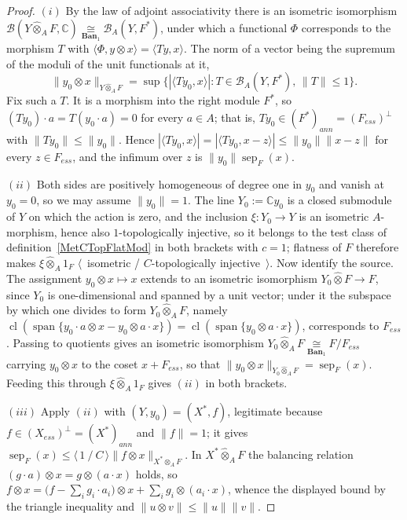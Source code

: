 \documentclass[11pt]{article}
\theoremstyle{plain}
\theoremstyle{definition}
\newcommand{\projtens}{\mathbin{\widehat{\otimes}}}
\newcommand{\projmodtens}[1]{\mathbin{\widehat{\otimes}}_{#1}}
\newcommand{\isom}[1]{\mathrel{\mathop{\cong}\limits_{#1}}}
\DeclareMathOperator{\sep}{sep}
\begin{document}
\begin{proof}
$(i)$ By the law of adjoint associativity there is an isometric isomorphism
$\mathcal{B}(Y\projmodtens{A}F,\mathbb{C})
\isom{\mathbf{Ban}_1}\mathcal{B}_A(Y,F^*)$, under which a functional $\Phi$
corresponds to the morphism $T$ with
$\langle\Phi,y\otimes x\rangle=\langle Ty,x\rangle$. The norm of a vector being
the supremum of the moduli of the unit functionals at it,
\[
\lVert y_0\otimes x\rVert_{Y\projmodtens{A}F}
=\sup \{|\langle Ty_0,x\rangle|:T\in\mathcal{B}_A(Y,F^*),\,\lVert T\rVert\leq 1 \}.
\]
Fix such a $T$. It is a morphism into the right module $F^*$, so
$(Ty_0)\cdot a=T(y_0\cdot a)=0$ for every $a\in A$; that is,
$Ty_0\in{(F^*)}_{ann}={(F_{ess})}^\perp$ with
$\lVert Ty_0\rVert\leq\lVert y_0\rVert$. Hence
$|\langle Ty_0,x\rangle|=|\langle Ty_0,x-z\rangle|\leq\lVert y_0\rVert
\lVert x-z\rVert$ for every $z\in F_{ess}$, and the infimum over $z$ is
$\lVert y_0\rVert\sep_F(x)$.

$(ii)$ Both sides are positively homogeneous of degree one in $y_0$ and vanish at
$y_0=0$, so we may assume $\lVert y_0\rVert=1$. The line $Y_0:=\mathbb{C}y_0$ is
a closed submodule of $Y$ on which the action is zero, and the inclusion
$\xi:Y_0\to Y$ is an isometric $A$-morphism, hence also $1$-topologically
injective, so it belongs to the test class of definition~\ref{MetCTopFlatMod} in
both brackets with $c=1$; flatness of $F$ therefore makes
$\xi\projmodtens{A}1_F$ $\langle$~isometric / $C$-topologically
injective~$\rangle$. Now identify the source. The assignment
$y_0\otimes x\mapsto x$ extends to an isometric isomorphism
$Y_0\projtens F\to F$, since $Y_0$ is one-dimensional and spanned by a unit
vector; under it the subspace by which one divides to form
$Y_0\projmodtens{A}F$, namely
$\operatorname{cl}(\operatorname{span} \{
  y_0\cdot a\otimes x-y_0\otimes a\cdot x \})
=\operatorname{cl}(\operatorname{span} \{y_0\otimes a\cdot x \})$, corresponds to
$F_{ess}$. Passing to quotients gives an isometric isomorphism
$Y_0\projmodtens{A}F\isom{\mathbf{Ban}_1}F/F_{ess}$ carrying $y_0\otimes x$ to
the coset $x+F_{ess}$, so that
$\lVert y_0\otimes x\rVert_{Y_0\projmodtens{A}F}=\sep_F(x)$. Feeding this through
$\xi\projmodtens{A}1_F$ gives $(ii)$ in both brackets.

$(iii)$ Apply $(ii)$ with $(Y,y_0)=(X^*,f)$, legitimate because
$f\in{(X_{ess})}^\perp={(X^*)}_{ann}$ and $\lVert f\rVert=1$; it gives
$\sep_F(x)\leq\langle\,1\ /\ C\,\rangle\lVert f\otimes x\rVert_{X^*\projmodtens{A}F}$.
In $X^*\projmodtens{A}F$ the balancing relation
$(g\cdot a)\otimes x=g\otimes(a\cdot x)$ holds, so
$f\otimes x= \bigl(f-\sum_i g_i\cdot a_i \bigr)\otimes x
+\sum_i g_i\otimes(a_i\cdot x)$, whence the displayed bound by the triangle
inequality and $\lVert u\otimes v\rVert\leq\lVert u\rVert\lVert v\rVert$.
\end{proof}
\end{document}
